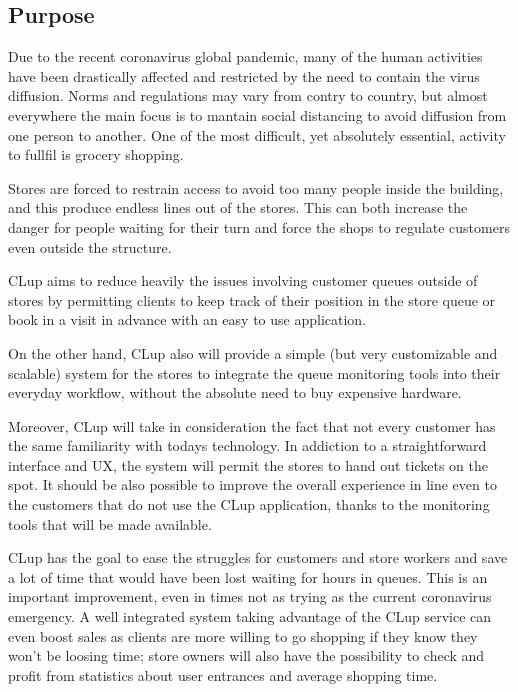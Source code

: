\subsection{Purpose}

Due to the recent coronavirus global pandemic, many of the human activities have been drastically affected and restricted by the need to contain the virus diffusion.
Norms and regulations may vary from contry to country, but almost everywhere the main focus is to mantain social distancing to avoid diffusion from one person to another.
One of the most difficult, yet absolutely essential, activity to fullfil is grocery shopping.


Stores are forced to restrain access to avoid too many people inside the building,
and this produce endless lines out of the stores. This can both increase the danger for people waiting for their turn and force the shops to regulate customers even outside the structure.


CLup aims to reduce heavily the issues involving customer queues outside of stores by permitting clients to keep track of their position in the store queue or book in a visit in advance with an easy to use application.


On the other hand, CLup also will provide a simple (but very customizable and scalable) system for the stores to integrate the queue monitoring tools into their everyday workflow, without the absolute need to buy expensive hardware.


Moreover, CLup will take in consideration the fact that not every customer has the same familiarity with todays technology.
In addiction to a straightforward interface and UX, the system will permit the stores to hand out tickets on the spot. It should be also possible to improve the overall experience in line even to the customers that do not use the CLup application, thanks to the monitoring tools that will be made available.


CLup has the goal to ease the struggles for customers and store workers and save a lot of time that would have been lost waiting for hours in queues. This is an important improvement, even in times not as trying as the current coronavirus emergency.
A well integrated system taking advantage of the CLup service can even boost sales as clients are more willing to go shopping if they know they won't be loosing time; store owners will also have the possibility to check and profit from statistics about user entrances and average shopping time.

